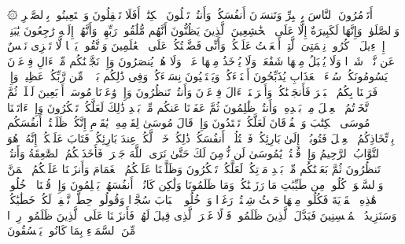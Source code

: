 \startbuffer[\q:2:44]
۞ أَتَأۡمُرُونَ ٱلنَّاسَ بِٱلۡبِرِّ وَتَنسَوۡنَ أَنفُسَكُمۡ وَأَنتُمۡ تَتۡلُونَ ٱلۡكِتَٰبَۚ أَفَلَا تَعۡقِلُونَ%
\stopbuffer%
\startbuffer[\q:2:45]
وَٱسۡتَعِینُوا۟ بِٱلصَّبۡرِ وَٱلصَّلَوٰةِۚ وَإِنَّهَا لَكَبِیرَةٌ إِلَّا عَلَى ٱلۡخَٰشِعِینَ%
\stopbuffer%
\startbuffer[\q:2:46]
ٱلَّذِینَ یَظُنُّونَ أَنَّهُم مُّلَٰقُوا۟ رَبِّهِمۡ وَأَنَّهُمۡ إِلَیۡهِ رَٰجِعُونَ%
\stopbuffer%
\startbuffer[\q:2:47]
یَٰبَنِیۤ إِسۡرَٰۤءِیلَ ٱذۡكُرُوا۟ نِعۡمَتِیَ ٱلَّتِیۤ أَنۡعَمۡتُ عَلَیۡكُمۡ وَأَنِّی فَضَّلۡتُكُمۡ عَلَى ٱلۡعَٰلَمِینَ%
\stopbuffer%
\startbuffer[\q:2:48]
وَٱتَّقُوا۟ یَوۡمࣰا لَّا تَجۡزِی نَفۡسٌ عَن نَّفۡسࣲ شَیۡءࣰا وَلَا یُقۡبَلُ مِنۡهَا شَفَٰعَةࣱ وَلَا یُؤۡخَذُ مِنۡهَا عَدۡلࣱ وَلَا هُمۡ یُنصَرُونَ%
\stopbuffer%
\startbuffer[\q:2:49]
وَإِذۡ نَجَّیۡنَٰكُم مِّنۡ ءَالِ فِرۡعَوۡنَ یَسُومُونَكُمۡ سُوۤءَ ٱلۡعَذَابِ یُذَبِّحُونَ أَبۡنَاۤءَكُمۡ وَیَسۡتَحۡیُونَ نِسَاۤءَكُمۡۚ وَفِی ذَٰلِكُم بَلَاۤءࣱ مِّن رَّبِّكُمۡ عَظِیمࣱ%
\stopbuffer%
\startbuffer[\q:2:50]
وَإِذۡ فَرَقۡنَا بِكُمُ ٱلۡبَحۡرَ فَأَنجَیۡنَٰكُمۡ وَأَغۡرَقۡنَاۤ ءَالَ فِرۡعَوۡنَ وَأَنتُمۡ تَنظُرُونَ%
\stopbuffer%
\startbuffer[\q:2:51]
وَإِذۡ وَٰعَدۡنَا مُوسَىٰۤ أَرۡبَعِینَ لَیۡلَةࣰ ثُمَّ ٱتَّخَذۡتُمُ ٱلۡعِجۡلَ مِنۢ بَعۡدِهِۦ وَأَنتُمۡ ظَٰلِمُونَ%
\stopbuffer%
\startbuffer[\q:2:52]
ثُمَّ عَفَوۡنَا عَنكُم مِّنۢ بَعۡدِ ذَٰلِكَ لَعَلَّكُمۡ تَشۡكُرُونَ%
\stopbuffer%
\startbuffer[\q:2:53]
وَإِذۡ ءَاتَیۡنَا مُوسَى ٱلۡكِتَٰبَ وَٱلۡفُرۡقَانَ لَعَلَّكُمۡ تَهۡتَدُونَ%
\stopbuffer%
\startbuffer[\q:2:54]
وَإِذۡ قَالَ مُوسَىٰ لِقَوۡمِهِۦ یَٰقَوۡمِ إِنَّكُمۡ ظَلَمۡتُمۡ أَنفُسَكُم بِٱتِّخَاذِكُمُ ٱلۡعِجۡلَ فَتُوبُوۤا۟ إِلَىٰ بَارِئِكُمۡ فَٱقۡتُلُوۤا۟ أَنفُسَكُمۡ ذَٰلِكُمۡ خَیۡرࣱ لَّكُمۡ عِندَ بَارِئِكُمۡ فَتَابَ عَلَیۡكُمۡۚ إِنَّهُۥ هُوَ ٱلتَّوَّابُ ٱلرَّحِیمُ%
\stopbuffer%
\startbuffer[\q:2:55]
وَإِذۡ قُلۡتُمۡ یَٰمُوسَىٰ لَن نُّؤۡمِنَ لَكَ حَتَّىٰ نَرَى ٱللَّهَ جَهۡرَةࣰ فَأَخَذَتۡكُمُ ٱلصَّٰعِقَةُ وَأَنتُمۡ تَنظُرُونَ%
\stopbuffer%
\startbuffer[\q:2:56]
ثُمَّ بَعَثۡنَٰكُم مِّنۢ بَعۡدِ مَوۡتِكُمۡ لَعَلَّكُمۡ تَشۡكُرُونَ%
\stopbuffer%
\startbuffer[\q:2:57]
وَظَلَّلۡنَا عَلَیۡكُمُ ٱلۡغَمَامَ وَأَنزَلۡنَا عَلَیۡكُمُ ٱلۡمَنَّ وَٱلسَّلۡوَىٰۖ كُلُوا۟ مِن طَیِّبَٰتِ مَا رَزَقۡنَٰكُمۡۚ وَمَا ظَلَمُونَا وَلَٰكِن كَانُوۤا۟ أَنفُسَهُمۡ یَظۡلِمُونَ%
\stopbuffer%
\startbuffer[\q:2:58]
وَإِذۡ قُلۡنَا ٱدۡخُلُوا۟ هَٰذِهِ ٱلۡقَرۡیَةَ فَكُلُوا۟ مِنۡهَا حَیۡثُ شِئۡتُمۡ رَغَدࣰا وَٱدۡخُلُوا۟ ٱلۡبَابَ سُجَّدࣰا وَقُولُوا۟ حِطَّةࣱ نَّغۡفِرۡ لَكُمۡ خَطَٰیَٰكُمۡۚ وَسَنَزِیدُ ٱلۡمُحۡسِنِینَ%
\stopbuffer%
\startbuffer[\q:2:59]
فَبَدَّلَ ٱلَّذِینَ ظَلَمُوا۟ قَوۡلًا غَیۡرَ ٱلَّذِی قِیلَ لَهُمۡ فَأَنزَلۡنَا عَلَى ٱلَّذِینَ ظَلَمُوا۟ رِجۡزࣰا مِّنَ ٱلسَّمَاۤءِ بِمَا كَانُوا۟ یَفۡسُقُونَ%
